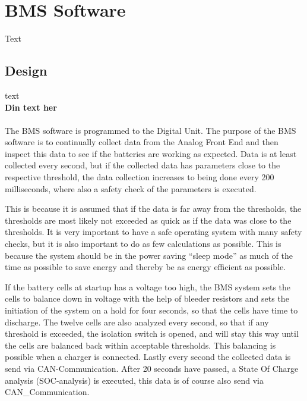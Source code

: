 \section{BMS Software}
Text

\subsection{Design}
text\\

\textbf{Din text her} \\
\\
The BMS software is programmed to the Digital Unit. The purpose of the BMS software is to continually collect data from the Analog Front End and then inspect this data to see if the batteries are working as expected. Data is at least collected every second, but if the collected data has parameters close to the respective threshold, the data collection increases to being done every 200 milliseconds, where also a safety check of the parameters is executed. 

This is because it is assumed that if the data is far away from the thresholds, the thresholds are most likely not exceeded as quick as if the data was close to the thresholds. It is very important to have a safe operating system with many safety checks, but it is also important to do as few calculations as possible. This is because the system should be in the power saving “sleep mode” as much of the time as possible to save energy and thereby be as energy efficient as possible.

If the battery cells at startup has a voltage too high, the BMS system sets the cells to balance down in voltage with the help of bleeder resistors and sets the initiation of the system on a hold for four seconds, so that the cells have time to discharge. The twelve cells are also analyzed every second, so that if any threshold is exceeded, the isolation switch is opened, and will stay this way until the cells are balanced back within acceptable thresholds. This balancing is possible when a charger is connected. Lastly every second the collected data is send via CAN-Communication. After 20 seconds have passed, a State Of Charge analysis (SOC-analysis) is executed, this data is of course also send via CAN\_Communication.

